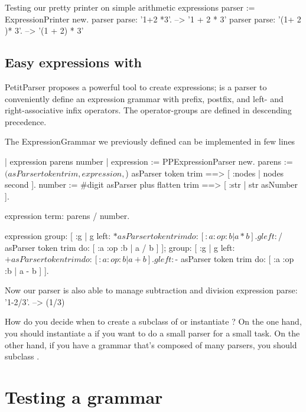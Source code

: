 \documentclass[a4paper,10pt,twoside]{book}
\begin{document}
\begin{script}{Testing our pretty printer on simple arithmetic expressions}
parser := ExpressionPrinter new.
parser parse: '1+2 *3'.          --> '1 + 2 * 3'
parser parse: '(1+ 2 )* 3'.      --> '(1 + 2) * 3'
\end{script}

\subsection{Easy expressions with }

PetitParser proposes a powerful tool to create expressions;
 is a parser to conveniently define an expression
grammar with prefix, postfix, and left- and right-associative infix
operators. The operator-groups are defined in descending precedence.

\begin{script}{The ExpressionGrammar we previously defined can be implemented in few lines}

| expression parens number |
expression := PPExpressionParser new.
parens := $( asParser token trim , expression , $) asParser token trim
==> [ :nodes | nodes second ].
number := #digit asParser plus flatten trim ==> [ :str | str asNumber ].

expression term: parens / number.

expression
  group: [ :g |
    g left: $* asParser token trim do: [ :a :op :b | a * b ].
    g left: $/ asParser token trim do: [ :a :op :b | a / b ] ];
  group: [ :g |
    g left: $+ asParser token trim do: [ :a :op :b | a + b ].
    g left: $- asParser token trim do: [ :a :op :b | a - b ] ].
\end{script}

\begin{script}{Now our parser is also able to manage subtraction and division}
expression parse: '1-2/3'.       --> (1/3)
\end{script}

How do you decide when to create a subclass of 
or instantiate ? On the one hand, you should
instantiate a  if you want to do a small parser
for a small task. On the other hand, if you have a grammar that's
composed of many parsers, you should subclass .

\section{Testing a grammar}
\end{document}
